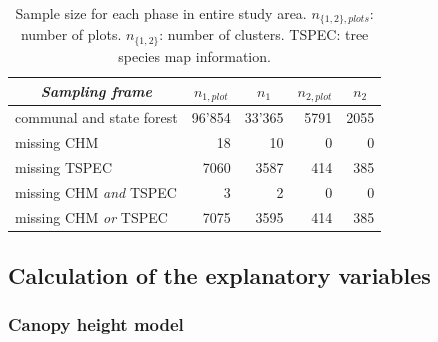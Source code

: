 \begin{table}[H]
	\begin{center}
		\caption{Sample size for each phase in entire study area. $n_{\{1,2\},plots}$: number of plots. $n_{\{1,2\}}$: number of clusters. TSPEC: tree species map information.}
		\vspace{0.2cm}
		\label{tab:ssize}
		{\small %
			\begin{tabular}{l|r|r|r|r}
				\hline
				\multicolumn{1}{c|}{\textit{Sampling frame}} & \multicolumn{1}{c|}{\textbf{$n_{1,plot}$}}  & \multicolumn{1}{c|}{\textbf{$n_1$}}  & \multicolumn{1}{c|}{\textbf{$n_{2,plot}$}}  & \multicolumn{1}{c}{\textbf{$n_2$}} \\ %
				\hline \hline
				communal and state forest & 96'854 & 33'365 & 5791 & 2055\\
				\hspace{5mm} \footnotesize missing CHM & \footnotesize 18 & \footnotesize 10 & \footnotesize 0 & \footnotesize 0\\ %
				\hspace{5mm} \footnotesize missing TSPEC & \footnotesize 7060  & \footnotesize 3587 & \footnotesize 414 & \footnotesize 385\\ %
				\hspace{5mm} \footnotesize missing CHM \textit{and} TSPEC & \footnotesize 3 & \footnotesize 2 & \footnotesize 0 & \footnotesize 0\\ %
				\hspace{5mm} \footnotesize missing CHM \textit{or} TSPEC & \footnotesize 7075 & \footnotesize 3595 & \footnotesize 414 & \footnotesize 385\\ %
				\hline \hline
			\end{tabular}
		} %
	\end{center}
\end{table}


\subsection{Calculation of the explanatory variables}
\label{sec:expvarcalc}

\subsubsection{Canopy height model}

